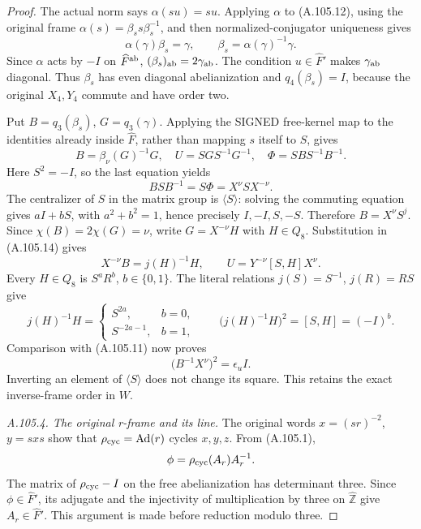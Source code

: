 \begin{proof}
The actual norm says \(\alpha(su)=su\). Applying \(\alpha\)
to (A.105.12), using the original frame \(\alpha(s)=\beta_s
s\beta_s^{-1}\), and then normalized-conjugator uniqueness gives
\[
 \alpha(\gamma)\beta_s=\gamma,\qquad
 \beta_s=\alpha(\gamma)^{-1}\gamma.
\tag{A.105.13}
\]
Since \(\alpha\) acts by \(-I\) on \(\widehat F^{\rm ab}\),
\((\beta_s)_{\rm ab}=2\gamma_{\rm ab}\). The condition
\(u\in\widehat F'\) makes \(\gamma_{\rm ab}\) diagonal.
Thus \(\beta_s\) has even diagonal abelianization and
\(q_4(\beta_s)=I\), because the original \(X_4,Y_4\) commute
and have order two.

Put \(B=q_3(\beta_s)\), \(G=q_3(\gamma)\). Applying the
SIGNED free-kernel map to the identities already inside
\(\widehat F\), rather than mapping \(s\) itself to \(S\), gives
\[
 B=\beta_\nu(G)^{-1}G,\quad
 U=SGS^{-1}G^{-1},\quad
 \Phi=SBS^{-1}B^{-1}.
\tag{A.105.14}
\]
Here \(S^2=-I\), so the last equation yields
\[
 BSB^{-1}=S\Phi=X^\nu SX^{-\nu}.
\]
The centralizer of \(S\) in the matrix group is \(\langle S\rangle\):
solving the commuting equation gives \(aI+bS\), with
\(a^2+b^2=1\), hence precisely \(I,-I,S,-S\).
Therefore \(B=X^\nu S^j\). Since
\(\chi(B)=2\chi(G)=\nu\), write \(G=X^{-\nu}H\) with \(H\in Q_8\).
Substitution in (A.105.14) gives
\[
 X^{-\nu}B=j(H)^{-1}H,\qquad
 U=Y^{-\nu}[S,H]X^\nu.
\tag{A.105.15}
\]
Every \(H\in Q_8\) is \(S^aR^b\), \(b\in\{0,1\}\).
The literal relations \(j(S)=S^{-1}\), \(j(R)=RS\) give
\[
 j(H)^{-1}H=
 \begin{cases}S^{2a},&b=0,\\S^{-2a-1},&b=1,\end{cases}
 \qquad
 \bigl(j(H)^{-1}H\bigr)^2=[S,H]=(-I)^b.
\tag{A.105.16}
\]
Comparison with (A.105.11) now proves
\[
 \bigl(B^{-1}X^\nu\bigr)^2=\epsilon_u I.
\tag{A.105.17}
\]
Inverting an element of \(\langle S\rangle\) does not change
its square. This retains the exact inverse-frame order in \(W\).

\emph{A.105.4. The original r-frame and its line.}
The original words \(x=(sr)^{-2}\), \(y=sxs\) show that
\(\rho_{\rm cyc}=\operatorname{Ad}(r)\) cycles \(x,y,z\).
From (A.105.1),
\[
 \phi=\rho_{\rm cyc}(A_r)A_r^{-1}.
\]
The matrix of \(\rho_{\rm cyc}-I\) on the free abelianization
has determinant three. Since \(\phi\in\widehat F'\), its
adjugate and the injectivity of multiplication by three on
\(\widehat{\mathbb Z}\) give \(A_r\in\widehat F'\).
This argument is made before reduction modulo three.


\end{proof}
